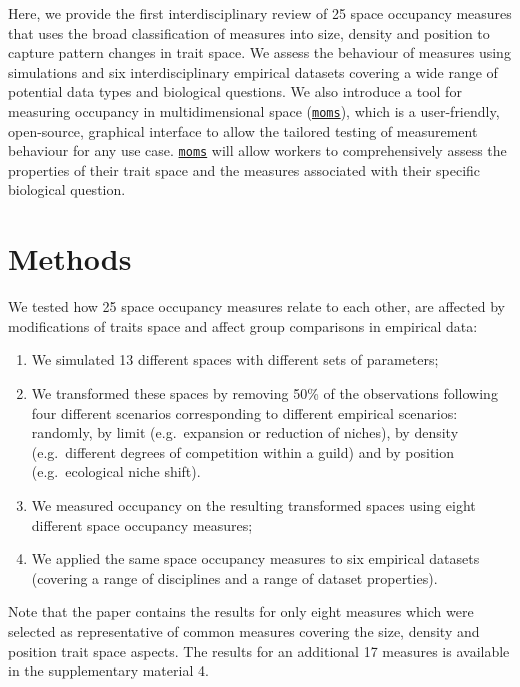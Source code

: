 \documentclass[]{article}
\providecommand{\tightlist}{%
  \setlength{\itemsep}{0pt}\setlength{\parskip}{0pt}}
\begin{document}
Here, we provide the first interdisciplinary review of 25 space
occupancy measures that uses the broad classification of measures into
size, density and position to capture pattern changes in trait space. We
assess the behaviour of measures using simulations and six
interdisciplinary empirical datasets covering a wide range of potential
data types and biological questions. We also introduce a tool for
measuring occupancy in multidimensional space
(\href{https://tguillerme.shinyapps.io/moms/}{\texttt{moms}}), which is
a user-friendly, open-source, graphical interface to allow the tailored
testing of measurement behaviour for any use case.
\href{https://tguillerme.shinyapps.io/moms/}{\texttt{moms}} will allow
workers to comprehensively assess the properties of their trait space
and the measures associated with their specific biological question.

\section{Methods}\label{methods}

We tested how 25 space occupancy measures relate to each other, are
affected by modifications of traits space and affect group comparisons
in empirical data:

\begin{enumerate}
\def\labelenumi{\arabic{enumi}.}
\tightlist
\item
  We simulated 13 different spaces with different sets of parameters;
\item
  We transformed these spaces by removing 50\% of the observations
  following four different scenarios corresponding to different
  empirical scenarios: randomly, by limit (e.g.~expansion or reduction
  of niches), by density (e.g.~different degrees of competition within a
  guild) and by position (e.g.~ecological niche shift).
\item
  We measured occupancy on the resulting transformed spaces using eight
  different space occupancy measures;
\item
  We applied the same space occupancy measures to six empirical datasets
  (covering a range of disciplines and a range of dataset properties).
\end{enumerate}

Note that the paper contains the results for only eight measures which
were selected as representative of common measures covering the size,
density and position trait space aspects. The results for an additional
17 measures is available in the supplementary material 4.
\end{document}
